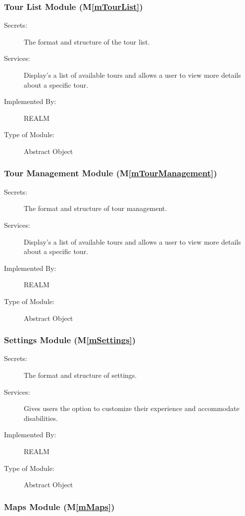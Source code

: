 \documentclass[12pt, titlepage]{article}
\newcommand{\mref}[1]{M\ref{#1}}
\begin{document}
\subsubsection{Tour List Module (\mref{mTourList})}

\begin{description}
\item[Secrets:]The format and structure of the tour list.
\item[Services:]Display's a list of available tours and allows a user to view more details about a specific tour.
\item[Implemented By:]REALM
\item[Type of Module:]Abstract Object
\end{description}

\subsubsection{Tour Management Module (\mref{mTourManagement})}

\begin{description}
\item[Secrets:]The format and structure of tour management.
\item[Services:]Display's a list of available tours and allows a user to view more details about a specific tour.
\item[Implemented By:]REALM
\item[Type of Module:]Abstract Object
\end{description}

\subsubsection{Settings Module (\mref{mSettings})}

\begin{description}
\item[Secrets:]The format and structure of settings.
\item[Services:]Gives users the option to customize their experience and accommodate disabilities.
\item[Implemented By:]REALM
\item[Type of Module:]Abstract Object
\end{description}

\subsubsection{Maps Module (\mref{mMaps})}
\end{document}
